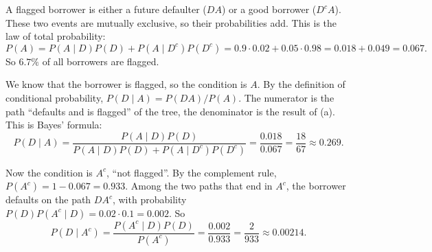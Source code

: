 \begin{solution}
	 A flagged borrower is either a future defaulter ($DA$) or a good
	borrower ($D^cA$). These two events are mutually exclusive, so their
	probabilities add. This is the law of total probability:
	\[ P(A)=P(A\mid D)P(D)+P(A\mid D^c)P(D^c)
		=0.9\cdot0.02+0.05\cdot0.98=0.018+0.049=0.067. \]
	So $6.7\%$ of all borrowers are flagged.

	 We know that the borrower is flagged, so the condition is $A$.
	By the definition of conditional probability,
	$P(D\mid A)=P(DA)/P(A)$. The numerator is the path ``defaults and is
	flagged'' of the tree, the denominator is the result of (a). This is
	Bayes' formula:
	\[ P(D\mid A)=\frac{P(A\mid D)P(D)}{P(A\mid D)P(D)+P(A\mid D^c)P(D^c)}
		=\frac{0.018}{0.067}=\frac{18}{67}\approx0.269. \]

	 Now the condition is $A^c$, ``not flagged''. By the complement
	rule, $P(A^c)=1-0.067=0.933$. Among the two paths that end in $A^c$, the
	borrower defaults on the path $DA^c$, with probability
	$P(D)P(A^c\mid D)=0.02\cdot0.1=0.002$. So
	\[ P(D\mid A^c)=\frac{P(A^c\mid D)P(D)}{P(A^c)}=\frac{0.002}{0.933}
		=\frac{2}{933}\approx0.00214. \]


\end{solution}

